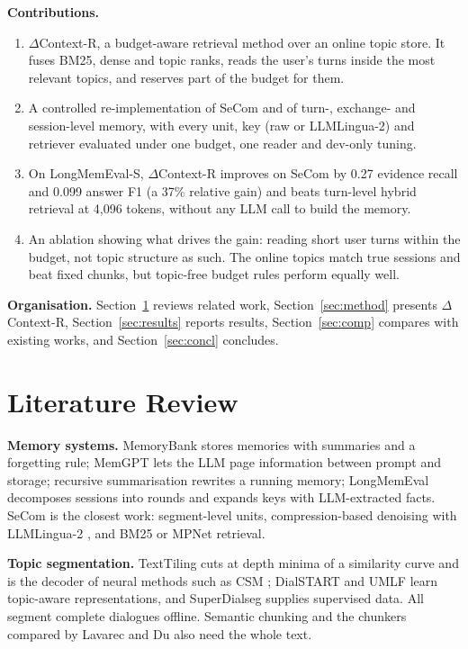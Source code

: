 \documentclass[conference]{IEEEtran}
\newcommand{\dcr}{$\Delta$Context-R}
\begin{document}
\textbf{Contributions.}
\begin{enumerate}
\item \dcr{}, a budget-aware retrieval method over an online topic store. It
fuses BM25, dense and topic ranks, reads the user's turns inside the most
relevant topics, and reserves part of the budget for them.
\item A controlled re-implementation of SeCom and of turn-, exchange- and
session-level memory, with every unit, key (raw or LLMLingua-2) and retriever
evaluated under one budget, one reader and dev-only tuning.
\item On LongMemEval-S, \dcr{} improves on SeCom by 0.27 evidence recall and
0.099 answer F1 (a 37\% relative gain) and beats turn-level hybrid retrieval at
4,096 tokens, without any LLM call to build the memory.
\item An ablation showing what drives the gain: reading short user turns within
the budget, not topic structure as such. The online topics match true sessions
and beat fixed chunks, but topic-free budget rules perform equally well.
\end{enumerate}

\textbf{Organisation.} Section~\ref{sec:lit} reviews related work,
Section~\ref{sec:method} presents \dcr{}, Section~\ref{sec:results} reports
results, Section~\ref{sec:comp} compares with existing works, and
Section~\ref{sec:concl} concludes.

\section{Literature Review}
\label{sec:lit}

\textbf{Memory systems.} MemoryBank \cite{zhong2024memorybank} stores memories
with summaries and a forgetting rule; MemGPT \cite{packer2023memgpt} lets the
LLM page information between prompt and storage; recursive summarisation
\cite{wang2025recursive} rewrites a running memory; LongMemEval
\cite{wu2025longmemeval} decomposes sessions into rounds and expands keys with
LLM-extracted facts. SeCom \cite{pan2025secom} is the closest work: segment-level
units, compression-based denoising with LLMLingua-2 \cite{pan2024llmlingua2},
and BM25 or MPNet retrieval.

\textbf{Topic segmentation.} TextTiling \cite{hearst1997texttiling} cuts at
depth minima of a similarity curve and is the decoder of neural methods such as
CSM \cite{xing2021csm}; DialSTART \cite{gao2023dialstart} and UMLF
\cite{xu2025umlf} learn topic-aware representations, and SuperDialseg
\cite{jiang2023superdialseg} supplies supervised data. All segment complete
dialogues offline. Semantic chunking \cite{langchain2024semantic} and the
chunkers compared by Lavarec and Du \cite{lavarec2026chunking} also need the
whole text.
\end{document}
